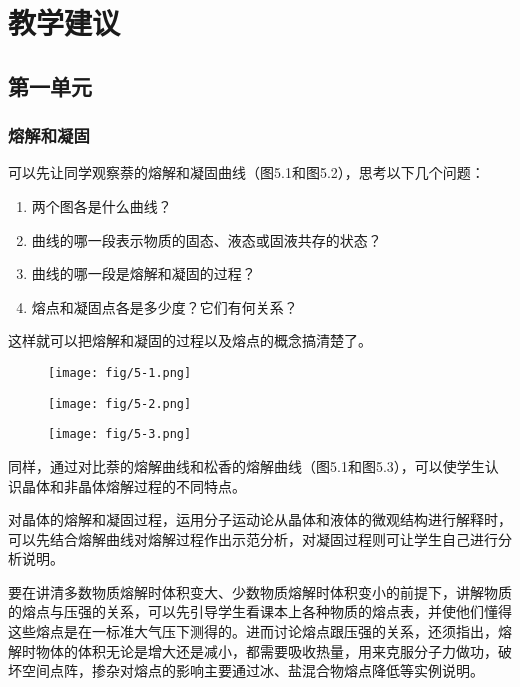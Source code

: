 \section{教学建议}
\subsection{第一单元}
\subsubsection{熔解和凝固} 

可以先让同学观察萘的熔解和凝固曲线（图5.1和图5.2），思考以下几个问题：
\begin{enumerate}
\item 两个图各是什么曲线？    \item 曲线的哪一段表示物质的固态、液态或固液共存的状态？    \item 曲线的哪一段是熔解和凝固的过程？    \item 熔点和凝固点各是多少度？它们有何关系？
\end{enumerate}
这样就可以把熔解和凝固的过程以及熔点的概念搞清楚了。
\begin{figure}[htp]\centering
    \begin{minipage}[t]{0.31\textwidth}
    \centering
    \texttt{[image: fig/5-1.png]}
    \caption{}
    \end{minipage}
    \begin{minipage}[t]{0.31\textwidth}
    \centering
    \texttt{[image: fig/5-2.png]}
    \caption{}
    \end{minipage}
    \begin{minipage}[t]{0.31\textwidth}
        \centering
        \texttt{[image: fig/5-3.png]}
        \caption{}
        \end{minipage}
    \end{figure}

同样，通过对比萘的熔解曲线和松香的熔解曲线（图5.1和图5.3），可以使学生认识晶体和非晶体熔解过程的不同特点。

对晶体的熔解和凝固过程，运用分子运动论从晶体和液体的微观结构进行解释时，可以先结合熔解曲线对熔解过程作出示范分析，对凝固过程则可让学生自己进行分析说明。

要在讲清多数物质熔解时体积变大、少数物质熔解时体积变小的前提下，讲解物质的熔点与压强的关系，可以先引导学生看课本上各种物质的熔点表，并使他们懂得这些熔点是在一标准大气压下测得的。进而讨论熔点跟压强的关系，还须指出，熔解时物体的体积无论是增大还是减小，都需要吸收热量，用来克服分子力做功，破坏空间点阵，掺杂对熔点的影响主要通过冰、盐混合物熔点降低等实例说明。

